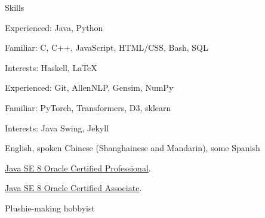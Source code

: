 
\begin{rubric}{Skills}
    \par Experienced: Java, Python
    \par Familiar: C, C++, JavaScript, HTML/CSS, Bash, SQL
    \par Interests: Haskell, \LaTeX
{}
    \par Experienced: Git, AllenNLP, Gensim, NumPy
    \par Familiar: PyTorch, Transformers, D3, sklearn
    \par Interests: Java Swing, Jekyll
    \par English, spoken Chinese (Shanghainese and Mandarin), some Spanish
\entry*[Certifications]
    \par \href{https://www.youracclaim.com/badges/c3d44a4e-fabc-4abb-b4fd-2079a364f6bd/public_url}{Java SE 8 Oracle Certified Professional}.
    \par \href{https://www.youracclaim.com/badges/fead7b2a-0382-45ea-9566-fb5a39d71972/public_url}{Java SE 8 Oracle Certified Associate}.
\entry*[Misc.]
    \par Plushie-making hobbyist
\end{rubric}
